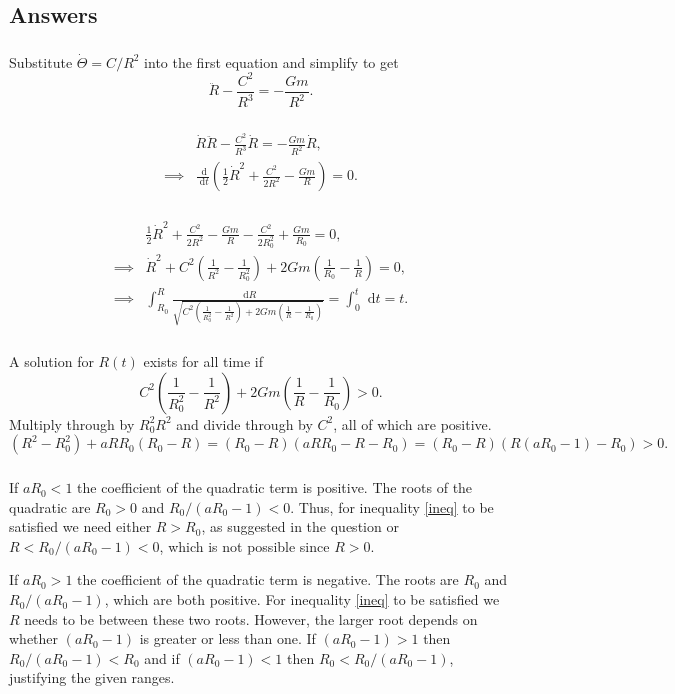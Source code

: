 \documentclass[]{article}
\newcommand{\bb}{\begin{equation}}
\newcommand{\ee}{\end{equation}}
\newcommand{\rd}{\text{ d}}
\renewcommand{\l}{\left(}
\renewcommand{\r}{\right)}
\begin{document}
\begin{Answ}
\subsection{Answers}
\subsubsection{}
Substitute $\dot{\Theta}=C/R^2$ into the first equation and simplify to get
\bb
\ddot{R}-\frac{C^2}{R^3}=-\frac{Gm}{R^2}.
\ee
\subsubsection{}
\begin{align}
&\dot{R}\ddot{R}-\frac{C^2}{R^3}\dot{R}=-\frac{Gm}{R^2}\dot{R},\nonumber\\
\implies&\frac{\rd}{\rd t}\l\frac{1}{2}\dot{R}^2+\frac{C^2}{2R^2}-\frac{Gm}{R}\r=0.
\end{align}

\subsubsection{}
\begin{align}
&\frac{1}{2}\dot{R}^2+\frac{C^2}{2R^2}-\frac{Gm}{R}-\frac{C^2}{2R_0^2}+\frac{Gm}{R_0}=0,\\
\implies &\dot{R}^2+C^2\l\frac{1}{R^2}-\frac{1}{R_0^2}\r+2Gm\l\frac{1}{R_0}-\frac{1}{R}\r=0,\\
\implies &\int^R_{R_0}\frac{\rd R}{\sqrt{C^2\l\frac{1}{R_0^2}-\frac{1}{R^2}\r+2Gm\l\frac{1}{R}-\frac{1}{R_0}\r}}=\int^t_0\rd t=t.
\end{align}
\subsubsection{}
A solution for $R(t)$ exists for all time if
\bb
C^2\l\frac{1}{R_0^2}-\frac{1}{R^2}\r+2Gm\l\frac{1}{R}-\frac{1}{R_0}\r>0.
\ee
Multiply through by $R_0^2R^2$ and divide through by $C^2$, all of which are positive.
\bb
\l R^2-R_0^2\r+aRR_0(R_0- R)=(R_0-R)\l aRR_0-R-R_0 \r=(R_0-R)\l R\l aR_0-1\r-R_0 \r>0.\label{ineq}
\ee
\subsubsection{}
If $aR_0<1$ the coefficient of the quadratic term is positive. The roots of the quadratic are $R_0>0$ and $R_0/(aR_0-1)<0$. Thus, for inequality \eqref{ineq} to be satisfied we need either $R>R_0$, as suggested in the question or $R<R_0/(aR_0-1)<0$, which is not possible since $R>0$.

If $aR_0>1$ the coefficient of the quadratic term is negative. The roots are $R_0$ and $R_0/(aR_0-1)$, which are both positive. For inequality \eqref{ineq} to be satisfied we $R$ needs to be between these two roots. However, the larger root depends on whether $(aR_0-1)$ is greater or less than one. If $(aR_0-1)>1$ then $R_0/(aR_0-1)<R_0$ and if $(aR_0-1)<1$ then $R_0<R_0/(aR_0-1)$, justifying the given ranges.
\end{Answ}
\end{document}
